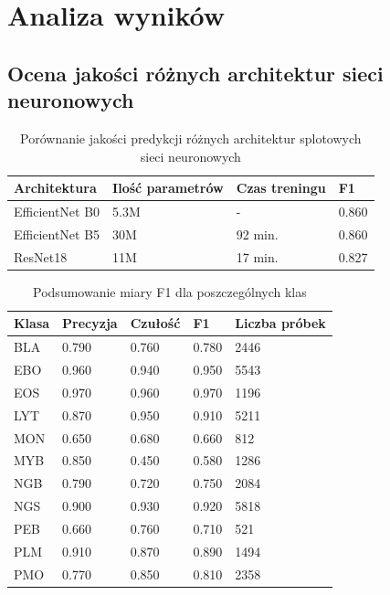 \chapter{Analiza wyników}

\section{Ocena jakości różnych architektur sieci neuronowych}

\begin{table}
    \caption{Porównanie jakości predykcji różnych architektur splotowych sieci neuronowych}
    \begin{center}
        \begin{tabular}{|l|l|l|l|}
            \hline
            Architektura & Ilość parametrów & Czas treningu & F1 \\
            \hline
            EfficientNet B0 & 5.3M & - & 0.860 \\
            \hline
            EfficientNet B5 & 30M & 92 min. & 0.860 \\
            \hline
            ResNet18 & 11M & 17 min. & 0.827 \\
            \hline
        \end{tabular}
    \end{center}
    \label{tab:comparison}
\end{table}


\begin{table}
    \caption{Podsumowanie miary F1 dla poszczególnych klas}
    \begin{center}
        \begin{tabular}{|l|l|l|l|l|}
            \hline
            Klasa & Precyzja & Czułość & F1 & Liczba próbek \\
            \hline
            BLA & 0.790 & 0.760 & 0.780 & 2446 \\
            \hline
            EBO & 0.960 & 0.940 & 0.950 & 5543 \\
            \hline
            EOS & 0.970 & 0.960 & 0.970 & 1196 \\
            \hline
            LYT & 0.870 & 0.950 & 0.910 & 5211 \\
            \hline
            MON & 0.650 & 0.680 & 0.660 & 812 \\
            \hline
            MYB & 0.850 & 0.450 & 0.580 & 1286 \\
            \hline
            NGB & 0.790 & 0.720 & 0.750 & 2084 \\
            \hline
            NGS & 0.900 & 0.930 & 0.920 & 5818 \\
            \hline
            PEB & 0.660 & 0.760 & 0.710 & 521 \\
            \hline
            PLM & 0.910 & 0.870 & 0.890 & 1494 \\
            \hline
            PMO & 0.770 & 0.850 & 0.810 & 2358 \\
            \hline
        \end{tabular}
    \end{center}
    \label{tab:f1_summary}
\end{table}

